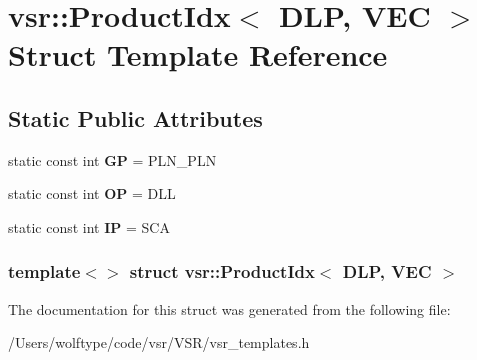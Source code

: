 \hypertarget{structvsr_1_1_product_idx_3_01_d_l_p_00_01_v_e_c_01_4}{\section{vsr\-:\-:Product\-Idx$<$ D\-L\-P, V\-E\-C $>$ Struct Template Reference}
\label{structvsr_1_1_product_idx_3_01_d_l_p_00_01_v_e_c_01_4}
}
\subsection*{Static Public Attributes}
\begin{DoxyCompactItemize}
\item 
\hypertarget{structvsr_1_1_product_idx_3_01_d_l_p_00_01_v_e_c_01_4_a461959f2b7d8447db21a2414e2cdf641}{static const int {\bfseries G\-P} = P\-L\-N\-\_\-\-P\-L\-N}\label{structvsr_1_1_product_idx_3_01_d_l_p_00_01_v_e_c_01_4_a461959f2b7d8447db21a2414e2cdf641}

\item 
\hypertarget{structvsr_1_1_product_idx_3_01_d_l_p_00_01_v_e_c_01_4_af4d04719e52242a85bae8bb4aae85307}{static const int {\bfseries O\-P} = D\-L\-L}\label{structvsr_1_1_product_idx_3_01_d_l_p_00_01_v_e_c_01_4_af4d04719e52242a85bae8bb4aae85307}

\item 
\hypertarget{structvsr_1_1_product_idx_3_01_d_l_p_00_01_v_e_c_01_4_a915b9035f2051e3b3e3e0f9b7fb4d8f4}{static const int {\bfseries I\-P} = S\-C\-A}\label{structvsr_1_1_product_idx_3_01_d_l_p_00_01_v_e_c_01_4_a915b9035f2051e3b3e3e0f9b7fb4d8f4}

\end{DoxyCompactItemize}
\subsubsection*{template$<$$>$ struct vsr\-::\-Product\-Idx$<$ D\-L\-P, V\-E\-C $>$}



The documentation for this struct was generated from the following file\-:\begin{DoxyCompactItemize}
\item 
/\-Users/wolftype/code/vsr/\-V\-S\-R/vsr\-\_\-templates.\-h\end{DoxyCompactItemize}
